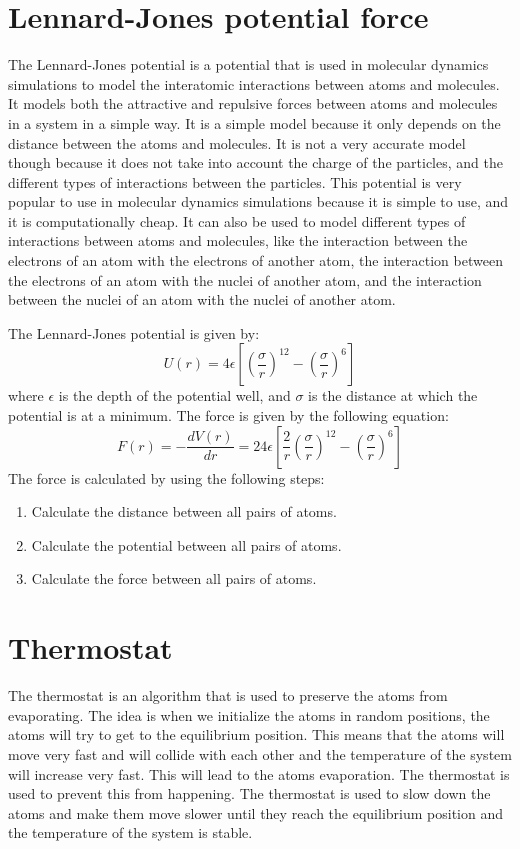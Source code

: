 \section{Lennard-Jones potential force}
    The Lennard-Jones potential is a potential that is used in molecular dynamics simulations to model the interatomic interactions between atoms and molecules. It models both the attractive and repulsive forces between atoms and molecules in a system in a simple way. It is a simple model because it only depends on the distance between the atoms and molecules. It is not a very accurate model though because it does not take into account the charge of the particles, and the different types of interactions between the particles. This potential is very popular to use in molecular dynamics simulations because it is simple to use, and it is computationally cheap. It can also be used to model different types of interactions between atoms and molecules, like the interaction between the electrons of an atom with the electrons of another atom, the interaction between the electrons of an atom with the nuclei of another atom, and the interaction between the nuclei of an atom with the nuclei of another atom.

    The Lennard-Jones potential is given by:
    \begin{equation}
        U(r) = 4\epsilon\left[\left(\frac{\sigma}{r}\right)^{12}-\left(\frac{\sigma}{r}\right)^6\right]
    \end{equation}
    where $\epsilon$ is the depth of the potential well, and $\sigma$ is the distance at which the potential is at a minimum.
    The force is given by the following equation:
    \begin{equation}
        F(r) = -\frac{dV(r)}{dr} = 24\epsilon\left[\frac{2}{r}\left(\frac{\sigma}{r}\right)^{12}-\left(\frac{\sigma}{r}\right)^6\right]
    \end{equation}
    The force is calculated by using the following steps:
    \begin{enumerate}
        \item Calculate the distance between all pairs of atoms.
        \item Calculate the potential between all pairs of atoms.
        \item Calculate the force between all pairs of atoms.
    \end{enumerate}

\section{Thermostat}
    The thermostat is an algorithm that is used to preserve the atoms from evaporating. The idea is when we initialize the atoms in random positions, the atoms will try to get to the equilibrium position. This means that the atoms will move very fast and will collide with each other and the temperature of the system will increase very fast. This will lead to the atoms evaporation. The thermostat is used to prevent this from happening. The thermostat is used to slow down the atoms and make them move slower until they reach the equilibrium position and the temperature of the system is stable. 
    
